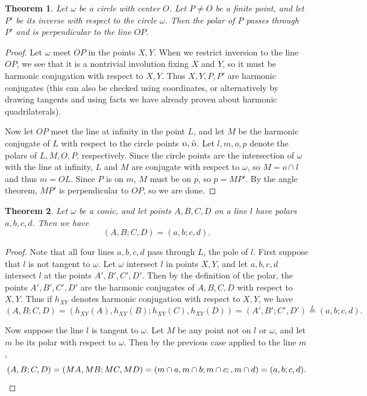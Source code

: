 \documentclass[letterpaper,11pt]{article}
\newtheorem{thm}{Theorem}
\theoremstyle{definition}
\theoremstyle{remark}
\begin{document}
\begin{thm} Let $\omega$ be a circle with center $O$. Let $P\ne O$ be a finite point, and let $P'$ be its inverse with respect to the circle $\omega$. Then the polar of $P$ passes through $P'$ and is perpendicular to the line $OP$.
\end{thm}
\begin{proof} Let $\omega$ meet $OP$ in the points $X,Y$. When we restrict inversion to the line $OP$, we see that it is a nontrivial involution fixing $X$ and $Y$, so it must be harmonic conjugation with respect to $X,Y$. Thus $X,Y,P,P'$ are harmonic conjugates (this can also be checked using coordinates, or alternatively by drawing tangents and using facts we have already proven about harmonic quadrilaterals).

Now let $OP$ meet the line at infinity in the point $L$, and let $M$ be the harmonic conjugate of $L$ with respect to the circle points $\fish, \bar\fish$. Let $l, m, o, p$ denote the polars of $L, M, O, P$, respectively. Since the circle points are the intersection of $\omega$ with the line at infinity, $L$ and $M$ are conjugate with respect to $\omega$, so $M = o\cap l$ and thus $m = OL$. Since $P$ is on $m$, $M$ must be on $p$, so $p = MP'$. By the angle theorem, $MP'$ is perpendicular to $OP$, so we are done.
\end{proof}

\begin{thm}\label{polarcross} Let $\omega$ be a conic, and let points $A,B,C,D$ on a line $l$ have polars $a,b,c,d$. Then we have
\[
(A,B;C,D) = (a,b;c,d).
\]
\end{thm}
\begin{proof} Note that all four lines $a,b,c,d$ pass through $L$, the pole of $l$. First suppose that $l$ is not tangent to $\omega$. Let $\omega$ intersect $l$ in points $X,Y$, and let $a,b,c,d$ intersect $l$ at the points $A',B',C',D'$. Then by the definition of the polar, the points $A',B',C',D'$ are the harmonic conjugates of $A,B,C,D$ with respect to $X,Y$. Thus if $h_{XY}$ denotes harmonic conjugation with respect to $X,Y$, we have
\[
(A,B;C,D) = (h_{XY}(A),h_{XY}(B);h_{XY}(C),h_{XY}(D)) = (A',B';C',D') \stackrel{L}{=} (a,b;c,d).
\]

Now suppose the line $l$ is tangent to $\omega$. Let $M$ be any point not on $l$ or $\omega$, and let $m$ be its polar with respect to $\omega$. Then by the previous case applied to the line $m$,
\[
(A,B;C,D) = (MA,MB;MC,MD) = (m\cap a, m\cap b; m\cap c;, m\cap d) = (a,b;c,d).\qedhere
\]
\end{proof}
\end{document}
